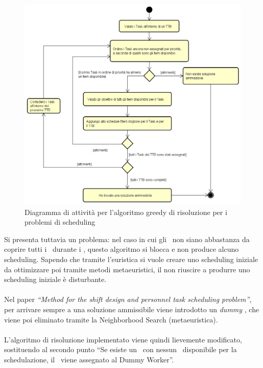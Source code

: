 \begin{figure}[!h]
    \begin{widepage}
        \includegraphics[width=14.9cm,keepaspectratio]{../immagini/algoritmo.png}
        \caption{Diagramma di attività per l'algoritmo greedy di risoluzione per i problemi di scheduling}
    \end{widepage}
\end{figure}
\FloatBarrier
\noindent
Si presenta tuttavia un problema: nel caso in cui gli \items\ non siano abbastanza da coprire tutti i \task\ durante i \ttb, questo algoritmo si blocca e non produce alcuno scheduling. Sapendo che tramite l'euristica si vuole creare uno scheduling iniziale da ottimizzare poi tramite metodi metaeuristici, il non riuscire a produrre uno scheduling iniziale è disturbante. \\
\\
Nel paper \textit{``Method for the shift design and personnel task scheduling problem''}, per arrivare sempre a una soluzione ammissibile viene introdotto un \emph{\gls{dummy}}\glsfirstoccur
, che viene poi eliminato tramite la Neighborhood Search (metaeuristica). \\
\\
L'algoritmo di risoluzione implementato viene quindi lievemente modificato, sostituendo al secondo punto ``Se esiste un \task\ con nessun \items\ disponibile per la schedulazione, il \task\ viene assegnato al Dummy Worker''.
